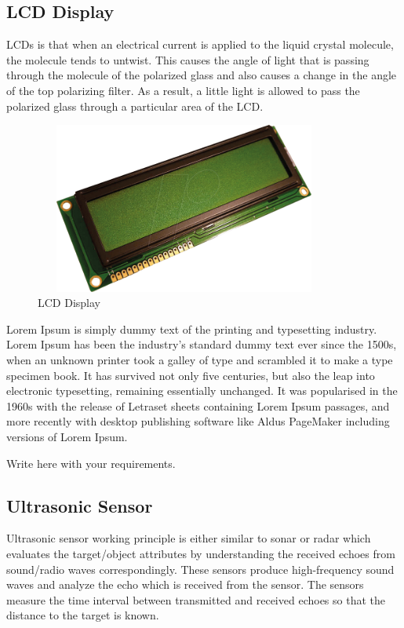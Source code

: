 	\subsection{LCD Display} LCDs is that when an electrical current is applied to the liquid crystal molecule, the molecule tends to untwist. This causes the angle of light that is passing through the molecule of the polarized glass and also causes a change in the angle of the top polarizing filter. As a result, a little light is allowed to pass the polarized glass through a particular area of the LCD.
	\begin{figure}[H]
	\centering
	\includegraphics[width=9.86cm,height=5.62cm]{./images/image3.png}
        \caption{LCD Display}
	\label{fig:speed_is_mhz__312}
	\end{figure}
	
	

	
	
	Lorem Ipsum is simply dummy text of the printing and typesetting industry. Lorem Ipsum has been the industry's standard dummy text ever since the 1500s, when an unknown printer took a galley of type and scrambled it to make a type specimen book. It has survived not only five centuries, but also the leap into electronic typesetting, remaining essentially unchanged. It was popularised in the 1960s with the release of Letraset sheets containing Lorem Ipsum passages, and more recently with desktop publishing software like Aldus PageMaker including versions of Lorem Ipsum.
	\vspace{3\baselineskip}
    \begin{center}
        \Large Write here with your requirements.
    \end{center}
	\vspace{3\baselineskip}



\subsection{Ultrasonic Sensor} Ultrasonic sensor working principle is either similar to sonar or radar which evaluates the target/object attributes by understanding the received echoes from sound/radio waves correspondingly. These sensors produce high-frequency sound waves and analyze the echo which is received from the sensor. The sensors measure the time interval between transmitted and received echoes so that the distance to the target is known.

